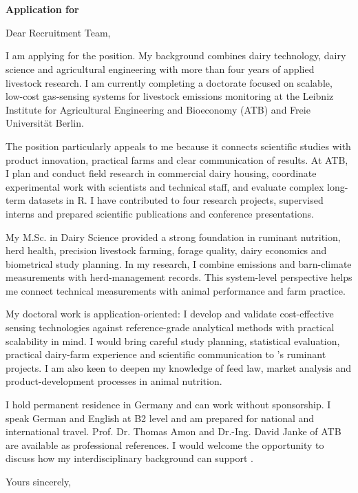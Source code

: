 
\CompanyName\\
\HiringTeamEN\\
\CompanyCityEN

\vspace{10pt}
\ApplicationDateEN

\vspace{10pt}
\textbf{Application for \JobTitleEN}

\vspace{8pt}
Dear Recruitment Team,

I am applying for the \JobTitleEN{} position. My background combines dairy technology, dairy science and agricultural engineering with more than four years of applied livestock research. I am currently completing a doctorate focused on scalable, low-cost gas-sensing systems for livestock emissions monitoring at the Leibniz Institute for Agricultural Engineering and Bioeconomy (ATB) and Freie Universität Berlin.

The position particularly appeals to me because it connects scientific studies with product innovation, practical farms and clear communication of results. At ATB, I plan and conduct field research in commercial dairy housing, coordinate experimental work with scientists and technical staff, and evaluate complex long-term datasets in R. I have contributed to four research projects, supervised interns and prepared scientific publications and conference presentations.

My M.Sc. in Dairy Science provided a strong foundation in ruminant nutrition, herd health, precision livestock farming, forage quality, dairy economics and biometrical study planning. In my research, I combine emissions and barn-climate measurements with herd-management records. This system-level perspective helps me connect technical measurements with animal performance and farm practice.

My doctoral work is application-oriented: I develop and validate cost-effective sensing technologies against reference-grade analytical methods with practical scalability in mind. I would bring careful study planning, statistical evaluation, practical dairy-farm experience and scientific communication to \CompanyName's ruminant projects. I am also keen to deepen my knowledge of feed law, market analysis and product-development processes in animal nutrition.

I hold permanent residence in Germany and can work without sponsorship. I speak German and English at B2 level and am prepared for national and international travel. Prof. Dr. Thomas Amon and Dr.-Ing. David Janke of ATB are available as professional references. I would welcome the opportunity to discuss how my interdisciplinary background can support \CompanyName.

Yours sincerely,

\vspace{14pt}
\CandidateName

